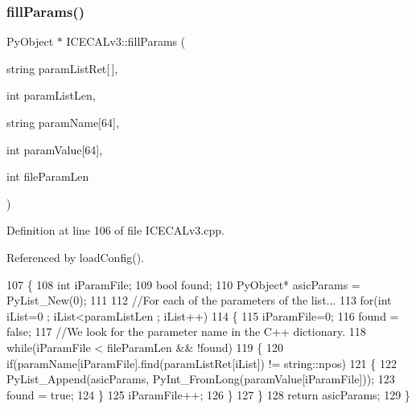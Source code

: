 \subsubsection{\texorpdfstring{fill\+Params()}{fillParams()}}
{\footnotesize\ttfamily Py\+Object $\ast$ I\+C\+E\+C\+A\+Lv3\+::fill\+Params (\begin{DoxyParamCaption}\item[{string}]{param\+List\+Ret\mbox{[}$\,$\mbox{]},  }\item[{int}]{param\+List\+Len,  }\item[{string}]{param\+Name\mbox{[}64\mbox{]},  }\item[{int}]{param\+Value\mbox{[}64\mbox{]},  }\item[{int}]{file\+Param\+Len }\end{DoxyParamCaption})\hspace{0.3cm}{\ttfamily [private]}}



Definition at line 106 of file I\+C\+E\+C\+A\+Lv3.\+cpp.



Referenced by load\+Config().


\begin{DoxyCode}
107 \{
108     \textcolor{keywordtype}{int} iParamFile;
109     \textcolor{keywordtype}{bool} found;
110     PyObject* asicParams = PyList\_New(0);
111 
112     \textcolor{comment}{//For each of the parameters of the list...}
113     \textcolor{keywordflow}{for}(\textcolor{keywordtype}{int} iList=0 ; iList<paramListLen ; iList++)
114     \{
115         iParamFile=0;
116         found = \textcolor{keyword}{false};
117         \textcolor{comment}{//We look for the parameter name in the C++ dictionary.}
118         \textcolor{keywordflow}{while}(iParamFile < fileParamLen && !found)
119         \{
120             \textcolor{keywordflow}{if}(paramName[iParamFile].find(paramListRet[iList]) != string::npos)
121             \{
122                 PyList\_Append(asicParams, PyInt\_FromLong(paramValue[iParamFile]));
123                 found = \textcolor{keyword}{true};
124             \}
125             iParamFile++;
126         \}
127     \}
128     \textcolor{keywordflow}{return} asicParams;
129 \}
\end{DoxyCode}
\mbox{\label{classICECALv3_a5f1414e6049a82eafdd505a88d7d0c91}} 
